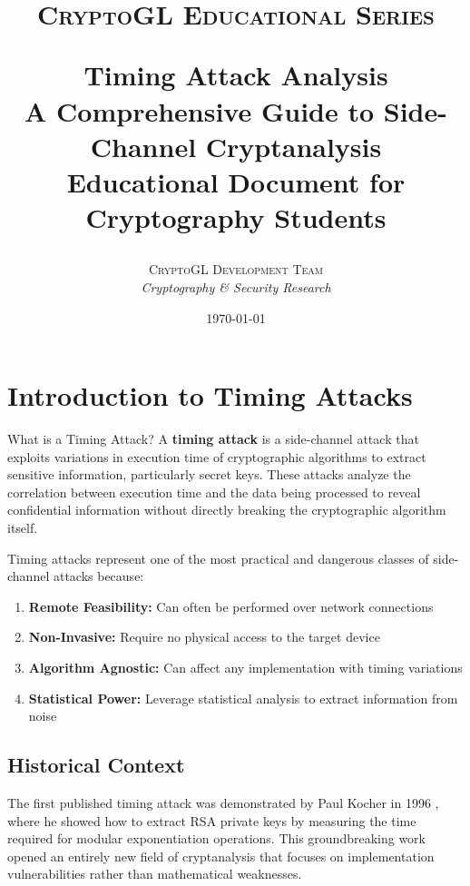 \documentclass[12pt,a4paper]{article}
\title{
    \vspace{-2cm}
    \begin{center}
    \textsc{\Large CryptoGL Educational Series}
    \end{center}
    \vspace{1cm}
    {\Huge\bfseries Timing Attack Analysis}\\
    \vspace{0.5cm}
    {\Large A Comprehensive Guide to Side-Channel Cryptanalysis}\\
    \vspace{1cm}
    {\large Educational Document for Cryptography Students}
}
\author{
    \textsc{CryptoGL Development Team}\\
    \textit{Cryptography \& Security Research}
}
\date{\today}
\theoremstyle{definition}
\begin{document}
\maketitle
\thispagestyle{empty}

\newpage

\tableofcontents
\newpage

\section{Introduction to Timing Attacks}

\begin{definitionbox}{What is a Timing Attack?}
A \textbf{timing attack} is a side-channel attack that exploits variations in execution time of cryptographic algorithms to extract sensitive information, particularly secret keys. These attacks analyze the correlation between execution time and the data being processed to reveal confidential information without directly breaking the cryptographic algorithm itself.
\end{definitionbox}

Timing attacks represent one of the most practical and dangerous classes of side-channel attacks because:

\begin{enumerate}
    \item \textbf{Remote Feasibility:} Can often be performed over network connections
    \item \textbf{Non-Invasive:} Require no physical access to the target device
    \item \textbf{Algorithm Agnostic:} Can affect any implementation with timing variations
    \item \textbf{Statistical Power:} Leverage statistical analysis to extract information from noise
\end{enumerate}

\subsection{Historical Context}

The first published timing attack was demonstrated by Paul Kocher in 1996 \cite{kocher1996timing}, where he showed how to extract RSA private keys by measuring the time required for modular exponentiation operations. This groundbreaking work opened an entirely new field of cryptanalysis that focuses on implementation vulnerabilities rather than mathematical weaknesses.
\end{document}
